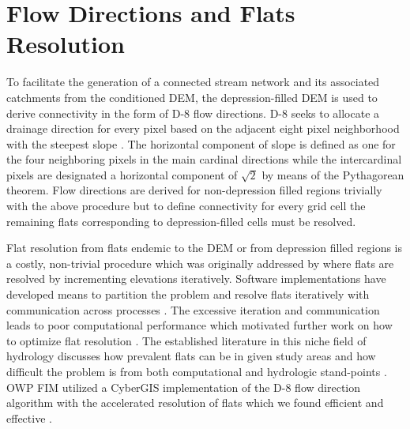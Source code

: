 \section{Flow Directions and Flats Resolution}
\label{sec:app_flow_direction_and_flat_resolution}
%
To facilitate the generation of a connected stream network and its associated catchments from the conditioned DEM, the depression-filled DEM is used to derive connectivity in the form of D-8 flow directions.
D-8 seeks to allocate a drainage direction for every pixel based on the adjacent eight pixel neighborhood with the steepest slope \cite{o1984extraction}.
The horizontal component of slope is defined as one for the four neighboring pixels in the main cardinal directions while the intercardinal pixels are designated a horizontal component of $\sqrt{2}$ by means of the Pythagorean theorem. 
Flow directions are derived for non-depression filled regions trivially with the above procedure but to define connectivity for every grid cell the remaining flats corresponding to depression-filled cells must be resolved.

Flat resolution from flats endemic to the DEM or from depression filled regions is a costly, non-trivial procedure which was originally addressed by  where flats are resolved by incrementing elevations iteratively.
Software implementations have developed means to partition the problem and resolve flats iteratively with communication across processes \cite{tarboton2009generalized,tesfa2011extraction,wallis2009parallel,tarboton2005terrain}.
The excessive iteration and communication leads to poor computational performance which motivated further work on how to optimize flat resolution \cite{survila2016scalable,barnes2014efficient}.
The established literature in this niche field of hydrology discusses how prevalent flats can be in given study areas and how difficult the problem is from both computational and hydrologic stand-points \cite{garbrecht1997assignment,tarboton2009generalized,tarboton2005terrain,survila2016scalable,barnes2014efficient,tesfa2011extraction,wallis2009parallel}.
OWP FIM utilized a CyberGIS implementation of the D-8 flow direction algorithm with the accelerated resolution of flats which we found efficient and effective \cite{survila2016scalable,cybergis2016}.